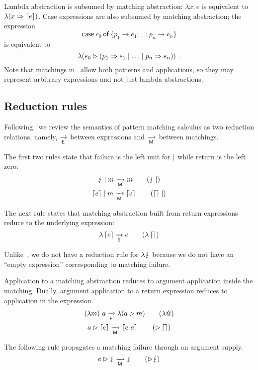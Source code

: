 Lambda abstraction is subsumed by matching abstraction:
$\lambda x.\, e$ is equivalent to
$\lambda (x \Rightarrow \left\lceil e\right\rceil)$.  Case expressions are also
subsumed by matching abstraction; the expression
\[
  \textsf{case}~ e_0 ~\textsf{of}~\{p_1\to e_1;\ldots; p_n\to e_n\}
\]
is equivalent to
\[
  \lambda(e_0\rhd (p_1 \Rightarrow e_1\mid\ldots \mid p_n \Rightarrow e_n)) \ .
\]
%
Note that matchings in \lambdaPMC\ allow both patterns and
applications, so they may represent arbitrary expressions
and not just lambda abstractions.  


\subsection{Reduction rules}
Following~\cite{kahl_2004} we review the semantics of pattern matching
calculus as two reduction relations, namely, $\xrightarrow[\textsf{E}]{}$ between
expressions and $\xrightarrow[\textsf{M}]{}$ between matchings. 

The first two rules state that failure is the left unit for
$\mid$ while return is the left zero:
\begin{gather}
  \matchalt{\matchfail}{m} \matred m \tag{$\matchfail\amatchalt$}  \\
  \matchalt{\matchreturn{e}}{m} \matred \matchreturn{e} \tag{$\matchreturn{}\amatchalt$}
\end{gather}

The next rule states that matching abstraction built from return expressions
reduce to the underlying expression:
\begin{equation}
  \lambda \matchreturn{e} \expred e  \tag{$\lambda\matchreturn{}$} 
\end{equation}

Unlike~\cite{kahl_2004}, we do not have a reduction rule for $\lambda \lightning$
because we do not have an ``empty expression'' corresponding to
matching failure. 

Application to a matching abstraction reduces to
argument application inside the matching.
Dually, argument application to a return expression reduces
to application in the expression.
\begin{gather}
  (\lambda m)~ a \expred \lambda(\matcharg{a}{m}) \tag{$\lambda @$}\\
  \matcharg{a}{\matchreturn{e}} \matred \matchreturn{e~a} \tag{$\amatcharg\matchreturn{}$} 
\end{gather}

The following rule propagates a matching failure through an argument supply.
\begin{equation}
  \matcharg{e}{\matchfail} \matred \matchfail \tag{$\amatcharg\matchfail$}
\end{equation}

